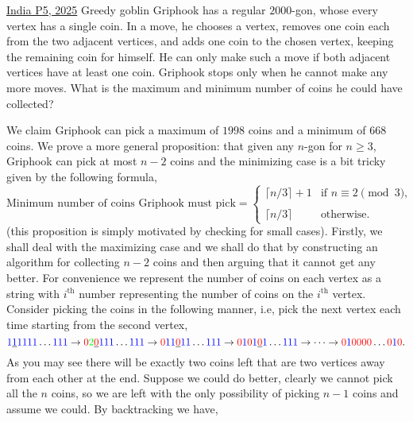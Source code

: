 \begin{problem}{2}{\href{https://artofproblemsolving.com/community/q1h3483100p34496847}{India P5, 2025}}
	Greedy goblin Griphook has a regular $2000$-gon, whose every vertex has a single coin. In a move, he chooses a vertex, removes one coin each from the two adjacent vertices, and adds one coin to the chosen vertex, keeping the remaining coin for himself. He can only make such a move if both adjacent vertices have at least one coin. Griphook stops only when he cannot make any more moves. What is the maximum and minimum number of coins he could have collected?
	\begin{solution} We claim Griphook can pick a maximum of $1998$ coins and a minimum of $668$ coins.
We prove a more general proposition: that given any $n$-gon for $n\ge 3$, Griphook can pick at most $n-2$ coins and the minimizing case is a bit tricky given by the following formula,
	$$\text{Minimum number of coins Griphook must pick}=
	\begin{cases}
		\lceil n/3\rceil+1 &\text{if $n\equiv 2\pmod{3}$,}\\\\
 		\lceil n/3\rceil & \text{otherwise.}
	\end{cases}$$
	(this proposition is simply motivated by checking for small cases). Firstly, we shall deal with the maximizing case and we shall do that by constructing an algorithm for collecting $n-2$ coins and then arguing that it cannot get any better. For convenience we represent the number of coins on each vertex as a string with $i^{\text{th}}$ number representing the number of coins on the $i^{\text{th}}$ vertex. Consider picking the coins in the following manner, i.e, pick the next vertex each time starting from the second vertex,
	$$\textcolor{blue}{1}\underline{\textcolor{blue}{1}}\textcolor{blue}{1111}\ldots \textcolor{blue}{111}\to \textcolor{red}{0}\textcolor{green}{2}\underline{\textcolor{red}{0}}\textcolor{blue}{111}\ldots\textcolor{blue}{111}\to \textcolor{red}{0}\textcolor{blue}{11}\underline{\textcolor{red}{0}}\textcolor{blue}{11}\ldots \textcolor{blue}{111}\to \textcolor{red}{0}\textcolor{blue}{1}\textcolor{red}{0}\textcolor{blue}{1}\underline{\textcolor{red}{0}}\textcolor{blue}{1}\ldots \textcolor{blue}{111}\to \cdots\to \textcolor{red}{0}\textcolor{blue}{1}\textcolor{red}{0000}\ldots \textcolor{red}{0}\textcolor{blue}{1}\textcolor{red}{0}.$$As you may see there will be exactly two coins left that are two vertices away from each other at the end. Suppose we could do better, clearly we cannot pick all the $n$ coins, so we are left with the only possibility of picking $n-1$ coins and assume we could. By backtracking we have,

\end{solution}
\end{problem}
